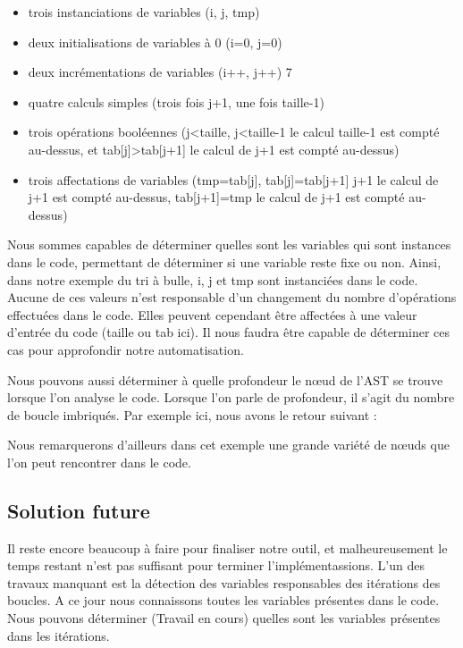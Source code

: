 \documentclass[12pt, twoside, openright]{report}
\begin{document}
\begin{itemize}
    \item trois instanciations de variables (i, j, tmp)
    \item deux initialisations de variables à 0 (i=0, j=0)
    \item deux incrémentations de variables (i++, j++) 7 
    \item quatre calculs simples (trois fois j+1, une fois taille-1)
    \item trois opérations booléennes (j<taille, j<taille-1 le calcul taille-1 est compté au-dessus, et tab[j]>tab[j+1] le calcul de j+1 est compté au-dessus)
    \item trois affectations de variables (tmp=tab[j], tab[j]=tab[j+1] j+1 le calcul de j+1 est compté au-dessus, tab[j+1]=tmp le calcul de j+1 est compté au-dessus)
\end{itemize}
\vspace{0.4cm}

Nous sommes capables de déterminer quelles sont les variables qui sont instances dans le code, permettant de déterminer si une variable reste fixe ou non. Ainsi, dans notre exemple du tri à bulle, i, j et tmp sont instanciées dans le code. Aucune de ces valeurs n'est responsable d'un changement du nombre d'opérations effectuées dans le code. Elles peuvent cependant être affectées à une valeur d'entrée du code (taille ou tab ici). Il nous faudra être capable de déterminer ces cas pour approfondir notre automatisation.

Nous pouvons aussi déterminer à quelle profondeur le n\oe{}ud de l'AST se trouve lorsque l'on analyse le code. Lorsque l'on parle de profondeur, il s'agit du nombre de boucle imbriqués. Par exemple ici, nous avons le retour suivant : 



Nous remarquerons d'ailleurs dans cet exemple une grande variété de n\oe{}uds que l'on peut rencontrer dans le code.

\subsection{Solution future}

Il reste encore beaucoup à faire pour finaliser notre outil, et malheureusement le temps restant n'est pas suffisant pour terminer l'implémentassions. L'un des travaux manquant est la détection des variables responsables des itérations des boucles. A ce jour nous connaissons toutes les variables présentes dans le code. Nous pouvons déterminer (Travail en cours) quelles sont les variables présentes dans les itérations.  
\end{document}
